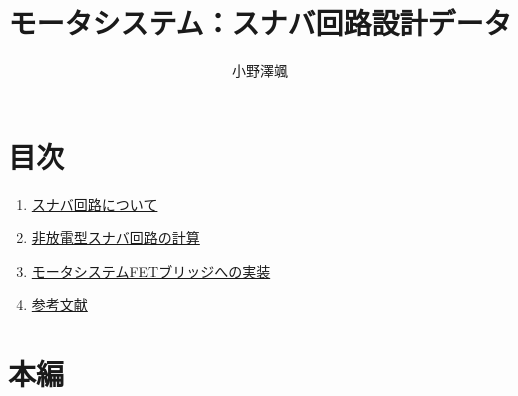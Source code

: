 \documentclass[12pt,a4paper,dvipdfmx]{jarticle}
\title{モータシステム：スナバ回路設計データ}
\author{小野澤颯}
\begin{document}
\maketitle
\section {目次}
\begin {enumerate}
	\item \hyperlink{section1}{スナバ回路について}
	\item \hyperlink{section2}{非放電型スナバ回路の計算}
	\item \hyperlink{section3}{モータシステムFETブリッジへの実装}
	\item \hyperlink{section4}{参考文献}
\end{enumerate}
\section {本編}
\end{document}
